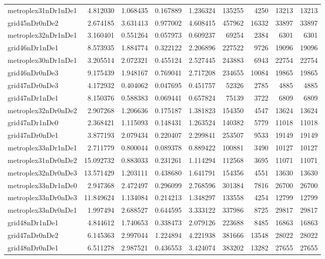 \documentclass[../../../thesis.tex]{subfiles}
\begin{document}
\begin{longtable}{|l|r|r|r|r|r|r|r|r|}
metroplex31nDr1nDe1 & 4.812030 & 1.068435 & 0.167889 & 1.236324 & 135255 & 4250 & 13213 & 13213 \\
grid45nDr0nDe2 & 2.674185 & 3.631413 & 0.977002 & 4.608415 & 457962 & 16332 & 33897 & 33897 \\
metroplex32nDr1nDe1 & 3.160401 & 0.551264 & 0.057973 & 0.609237 & 69254 & 2384 & 6301 & 6301 \\
grid46nDr1nDe1 & 8.573935 & 1.884774 & 0.322122 & 2.206896 & 227522 & 9726 & 19096 & 19096 \\
metroplex30nDr1nDe1 & 3.205514 & 2.072321 & 0.455124 & 2.527445 & 243883 & 6943 & 22754 & 22754 \\
grid46nDr0nDe3 & 9.175439 & 1.948167 & 0.769041 & 2.717208 & 234655 & 10084 & 19865 & 19865 \\
grid47nDr0nDe3 & 4.172932 & 0.404062 & 0.047695 & 0.451757 & 52326 & 2785 & 4885 & 4885 \\
grid47nDr1nDe1 & 8.150376 & 0.588383 & 0.069441 & 0.657824 & 75139 & 3722 & 6809 & 6809 \\
metroplex32nDr0nDe2 & 2.907268 & 1.206636 & 0.175187 & 1.381823 & 154350 & 4547 & 13624 & 13624 \\
grid47nDr1nDe0 & 2.368421 & 1.115093 & 0.148431 & 1.263524 & 140382 & 5779 & 11018 & 11018 \\
grid47nDr0nDe1 & 3.877193 & 2.079434 & 0.220407 & 2.299841 & 253507 & 9533 & 19149 & 19149 \\
metroplex33nDr1nDe1 & 2.711779 & 0.800044 & 0.089378 & 0.889422 & 100881 & 3490 & 10127 & 10127 \\
metroplex31nDr0nDe2 & 15.092732 & 0.883033 & 0.231261 & 1.114294 & 112568 & 3695 & 11071 & 11071 \\
metroplex32nDr0nDe3 & 13.571429 & 1.203111 & 0.438680 & 1.641791 & 154356 & 4551 & 13630 & 13630 \\
metroplex33nDr1nDe0 & 2.947368 & 2.472497 & 0.296099 & 2.768596 & 301384 & 7816 & 26700 & 26700 \\
metroplex33nDr0nDe3 & 11.849624 & 1.134084 & 0.214213 & 1.348297 & 133558 & 4254 & 12799 & 12799 \\
metroplex33nDr0nDe1 & 1.997494 & 2.688527 & 0.644595 & 3.333122 & 337986 & 8725 & 29817 & 29817 \\
grid48nDr1nDe1 & 4.844612 & 1.740653 & 0.338473 & 2.079126 & 223688 & 8485 & 16863 & 16863 \\
grid47nDr0nDe2 & 6.145363 & 2.997044 & 1.224894 & 4.221938 & 381666 & 13548 & 28022 & 28022 \\
grid48nDr0nDe1 & 6.511278 & 2.987521 & 0.436553 & 3.424074 & 383202 & 13282 & 27655 & 27655 \\

\end{longtable}
\end{document}

